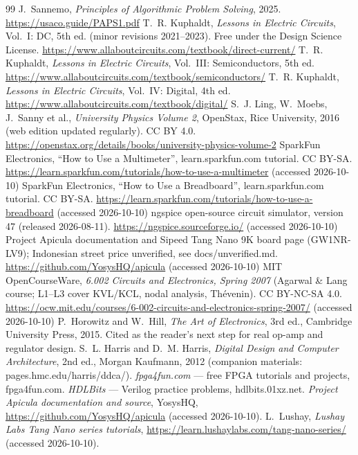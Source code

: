 \begin{thebibliography}{99}
 J.~Sannemo, \emph{Principles of Algorithmic Problem Solving}, 2025. \url{https://usaco.guide/PAPS1.pdf}
 T.~R. Kuphaldt, \emph{Lessons in Electric Circuits}, Vol.~I: DC, 5th ed. (minor revisions 2021--2023). Free under the Design Science License. \url{https://www.allaboutcircuits.com/textbook/direct-current/}
 T.~R. Kuphaldt, \emph{Lessons in Electric Circuits}, Vol.~III: Semiconductors, 5th ed. \url{https://www.allaboutcircuits.com/textbook/semiconductors/}
 T.~R. Kuphaldt, \emph{Lessons in Electric Circuits}, Vol.~IV: Digital, 4th ed. \url{https://www.allaboutcircuits.com/textbook/digital/}
 S.~J. Ling, W.~Moebs, J.~Sanny et al., \emph{University Physics Volume 2}, OpenStax, Rice University, 2016 (web edition updated regularly). CC BY 4.0. \url{https://openstax.org/details/books/university-physics-volume-2}
 SparkFun Electronics, ``How to Use a Multimeter'', learn.sparkfun.com tutorial. CC BY-SA. \url{https://learn.sparkfun.com/tutorials/how-to-use-a-multimeter} (accessed 2026-10-10)
 SparkFun Electronics, ``How to Use a Breadboard'', learn.sparkfun.com tutorial. CC BY-SA. \url{https://learn.sparkfun.com/tutorials/how-to-use-a-breadboard} (accessed 2026-10-10)
 ngspice open-source circuit simulator, version 47 (released 2026-08-11). \url{https://ngspice.sourceforge.io/} (accessed 2026-10-10)
 Project Apicula documentation and Sipeed Tang Nano 9K board page (GW1NR-LV9); Indonesian street price unverified, see docs/unverified.md. \url{https://github.com/YosysHQ/apicula} (accessed 2026-10-10)
 MIT OpenCourseWare, \emph{6.002 Circuits and Electronics, Spring 2007} (Agarwal \& Lang course; L1--L3 cover KVL/KCL, nodal analysis, Th\'evenin). CC BY-NC-SA 4.0. \url{https://ocw.mit.edu/courses/6-002-circuits-and-electronics-spring-2007/} (accessed 2026-10-10)
 P.~Horowitz and W.~Hill, \emph{The Art of Electronics}, 3rd ed., Cambridge University Press, 2015. Cited as the reader's next step for real op-amp and regulator design.
 S.~L. Harris and D.~M. Harris, \emph{Digital Design and Computer Architecture}, 2nd ed., Morgan Kaufmann, 2012 (companion materials: pages.hmc.edu/harris/ddca/).
 \emph{fpga4fun.com} --- free FPGA tutorials and projects, fpga4fun.com.
 \emph{HDLBits} --- Verilog practice problems, hdlbits.01xz.net.
 \emph{Project Apicula documentation and source}, YosysHQ,
\url{https://github.com/YosysHQ/apicula} (accessed 2026-10-10).
 L.~Lushay, \emph{Lushay Labs Tang Nano series tutorials},
\url{https://learn.lushaylabs.com/tang-nano-series/} (accessed 2026-10-10).
\end{thebibliography}
